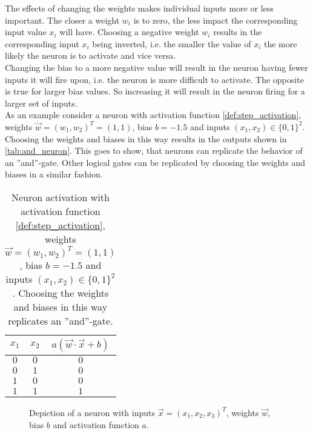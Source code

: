 The effects of changing the weights makes individual inputs more or less important. The closer a weight $w_i$ is to zero, the less impact the corresponding input value $x_i$ will have. Choosing a negative weight $w_i$ results in the corresponding input $x_i$ being inverted, i.e. the smaller the value of $x_i$ the more likely the neuron is to activate and vice versa.\\
Changing the bias to a more negative value will result in the neuron having fewer inputs it will fire upon, i.e. the neuron is more difficult to activate. The opposite is true for larger bias values. So increasing it will result in the neuron firing for a larger set of inputs.\\
As an example consider a neuron with activation function \eqref{def:step_activation}, weights $\vec{w}={(w_1, w_2)}^T=(1, 1)$, bias $b=-1.5$ and inputs $(x_1,x_2)\in{\{0,1\}}^2$. Choosing the weights and biases in this way results in the outputs shown in \autoref{tab:and_neuron}. This goes to show, that neurons can replicate the behavior of an ''and''-gate. Other logical gates can be replicated by choosing the weights and biases in a similar fashion.
\begin{table}
\begin{center}
\begin{tabular}{c c|c}
$x_1$ & $x_2$ & $a(\vec{w}\cdot\vec{x}+b)$\\
\hline
$0$ & $0$ & $0$\\
$0$ & $1$ & $0$\\
$1$ & $0$ & $0$\\
$1$ & $1$ & $1$\\
\end{tabular}
\caption[''OR''-neuron activations]{Neuron activation with activation function \eqref{def:step_activation}, weights $\vec{w}={(w_1, w_2)}^T=(1, 1)$, bias $b=-1.5$ and inputs $(x_1,x_2)\in{\{0,1\}}^2$. Choosing the weights and biases in this way replicates an ''and''-gate.}\label{tab:and_neuron}
\end{center}
\end{table}

\begin{figure}
\centering

\caption[Neuron]{Depiction of a neuron with inputs $\vec{x}={(x_1, x_2, x_3)}^T$, weights $\vec{w}$, bias $b$ and activation function $a$.}\label{fig:neuron}
\end{figure}

